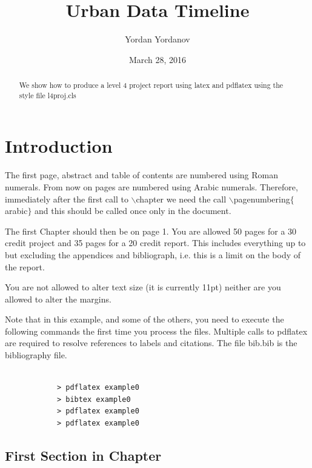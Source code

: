 \documentclass{l4proj}
\begin{document}
\title{Urban Data Timeline}
\author{Yordan Yordanov}
\date{March 28, 2016}
\maketitle

\begin{abstract}
We show how to produce a level 4 project report using latex and pdflatex using the 
style file l4proj.cls
\end{abstract}

\educationalconsent
%
%
\tableofcontents

\chapter{Introduction}
The first page, abstract and table of contents are numbered using Roman numerals. From now on pages are numbered
using Arabic numerals. Therefore, immediately after the first call to $\backslash$chapter we need the call
$\backslash$pagenumbering$\{$arabic$\}$ and this should be called once only in the document. 

The first Chapter should then be on page 1. You are allowed 50 pages for a 30 credit project and 35 pages for a 
20 credit report. This includes everything up to but excluding the appendices and bibliograph, i.e. this is a limit on
the body of the report.

You are not allowed to alter text size (it is currently 11pt) neither are you allowed to alter the margins.

Note that in this example, and some of the others, you need to execute the following commands the first time you process the files.
Multiple calls to pdflatex are required to resolve references to labels and citations. The file bib.bib is the bibliography file.

\begin{verbatim}

            > pdflatex example0
            > bibtex example0
            > pdflatex example0
            > pdflatex example0

\end{verbatim}


\section{First Section in Chapter}
\end{document}
